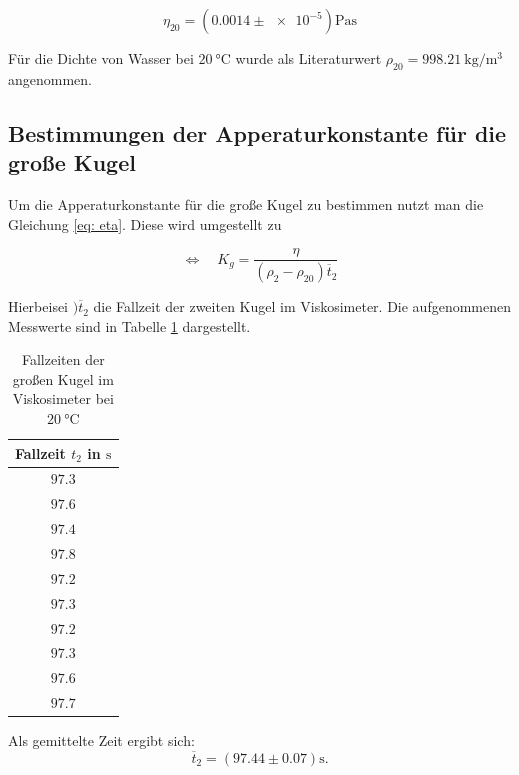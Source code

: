 \begin{equation}
\label{eq:viskosi_wasser}
\eta_{20}=\left(\num{0.0014}\pm\num{e-5}\right) \si{\pascal\second}
\end{equation}

Für die Dichte von Wasser bei $\SI{20}{\degreeCelsius}$ wurde als
Literaturwert $\rho_{20}=\SI{998.21}{\kilogram\per\cubic\meter}$ angenommen. %

\subsection{Bestimmungen der Apperaturkonstante für die große Kugel}
Um die Apperaturkonstante für die große Kugel zu bestimmen nutzt man die 
Gleichung \eqref{eq: eta}. Diese wird umgestellt zu 

\begin{equation*}
\Leftrightarrow \quad K_{g}=\frac{\eta}{\left(\rho_2-\rho_{20}\right)\overline{t}_2}
\end{equation*}

Hierbeisei $)\overline{t}_2$ die Fallzeit der zweiten Kugel im Viskosimeter.
Die aufgenommenen Messwerte sind in Tabelle \ref{tab:messwerte_fallzeit_kugel_gross} dargestellt.

\begin{table}
\centering
\begin{tabular} {c}
  \toprule
  Fallzeit $t_2$ in $\si{\second}$ \\
  \midrule
  $\num{97.3}$ \\
  $\num{97.6}$ \\
  $\num{97.4}$ \\
  $\num{97.8}$ \\
  $\num{97.2}$ \\
  $\num{97.3}$ \\
  $\num{97.2}$ \\
  $\num{97.3}$ \\
  $\num{97.6}$ \\
  $\num{97.7}$ \\
\bottomrule
\end{tabular}
\caption{Fallzeiten der großen Kugel im Viskosimeter bei $\SI{20}{\degreeCelsius}$}
\label{tab:messwerte_fallzeit_kugel_gross}
\end{table}

Als gemittelte Zeit ergibt sich:
\begin{equation}
\label{eq:gemittelte_fallzeit_gross}
\overline{t}_{2}=\left(\num{97.44}\pm\num{0.07}\right) \si{\second}.
\end{equation}

